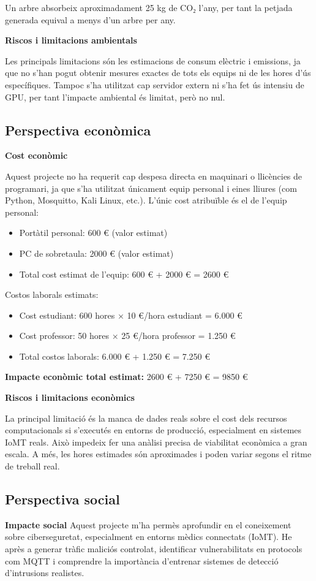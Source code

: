 Un arbre absorbeix aproximadament 25 kg de CO₂ l'any, per tant la petjada generada equival a menys d’un arbre per any.

\textbf{Riscos i limitacions ambientals}

Les principals limitacions són les estimacions de consum elèctric i emissions, ja que no s’han pogut obtenir mesures exactes de tots els equips ni de les hores d’ús específiques. Tampoc s’ha utilitzat cap servidor extern ni s’ha fet ús intensiu de GPU, per tant l’impacte ambiental és limitat, però no nul.

\subsection{Perspectiva econòmica}
\textbf{Cost econòmic}

Aquest projecte no ha requerit cap despesa directa en maquinari o llicències de programari, ja que s’ha utilitzat únicament equip personal i eines lliures (com Python, Mosquitto, Kali Linux, etc.). L’únic cost atribuïble és el de l’equip personal:
\begin{itemize}
    \item Portàtil personal: 600 € (valor estimat)
    \item PC de sobretaula: 2000 € (valor estimat)
    \item Total cost estimat de l'equip: 600 € + 2000 € = 2600 €
\end{itemize}

Costos laborals estimats:
\begin{itemize}
    \item Cost estudiant: 600 hores × 10 €/hora estudiant = 6.000 €
    \item Cost professor: 50 hores × 25 €/hora professor = 1.250 €
    \item Total costos laborals: 6.000 € + 1.250 € = 7.250 €
\end{itemize}
\textbf{Impacte econòmic total estimat:} 2600 € + 7250 € = 9850 €

\textbf{Riscos i limitacions econòmics}

La principal limitació és la manca de dades reals sobre el cost dels recursos computacionals si s’executés en entorns de producció, especialment en sistemes IoMT reals. Això impedeix fer una anàlisi precisa de viabilitat econòmica a gran escala. A més, les hores estimades són aproximades i poden variar segons el ritme de treball real.

\subsection{Perspectiva social}
\textbf{Impacte social}
Aquest projecte m’ha permès aprofundir en el coneixement sobre ciberseguretat, especialment en entorns mèdics connectats (IoMT). He après a generar tràfic maliciós controlat, identificar vulnerabilitats en protocols com MQTT i comprendre la importància d'entrenar sistemes de detecció d’intrusions realistes.

